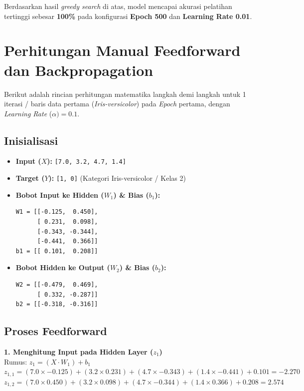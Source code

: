 \documentclass[12pt,a4paper]{article}
\begin{document}
Berdasarkan hasil \textit{greedy search} di atas, model mencapai akurasi pelatihan tertinggi sebesar \textbf{100\%} pada konfigurasi \textbf{Epoch 500} dan \textbf{Learning Rate 0.01}.

\newpage
\section{Perhitungan Manual Feedforward dan Backpropagation}

Berikut adalah rincian perhitungan matematika langkah demi langkah untuk 1 iterasi / baris data pertama (\textit{Iris-versicolor}) pada \textit{Epoch} pertama, dengan \textit{Learning Rate} ($\alpha) = 0.1$.

\subsection{Inisialisasi}
\begin{itemize}
    \item \textbf{Input ($X$):} \texttt{[7.0, 3.2, 4.7, 1.4]}
    \item \textbf{Target ($Y$):} \texttt{[1, 0]} (Kategori Iris-versicolor / Kelas 2)
    \item \textbf{Bobot Input ke Hidden ($W_1$) \& Bias ($b_1$):}
    \begin{lstlisting}
W1 = [[-0.125,  0.450],
      [ 0.231,  0.098],
      [-0.343, -0.344],
      [-0.441,  0.366]]
b1 = [[ 0.101,  0.208]]
    \end{lstlisting}
    \item \textbf{Bobot Hidden ke Output ($W_2$) \& Bias ($b_2$):}
    \begin{lstlisting}
W2 = [[-0.479,  0.469],
      [ 0.332, -0.287]]
b2 = [[-0.318, -0.316]]
    \end{lstlisting}
\end{itemize}

\subsection{Proses Feedforward}
\textbf{1. Menghitung Input pada Hidden Layer ($z_1$)} \\
Rumus: $z_1 = (X \cdot W_1) + b_1$ \\
$z_{1,1} = (7.0 \times -0.125) + (3.2 \times 0.231) + (4.7 \times -0.343) + (1.4 \times -0.441) + 0.101 = -2.270$ \\
$z_{1,2} = (7.0 \times 0.450) + (3.2 \times 0.098) + (4.7 \times -0.344) + (1.4 \times 0.366) + 0.208 = 2.574$
\end{document}
